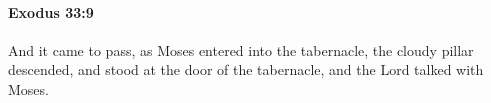
		\paragraph{Exodus 33:9} %
			\label{EXODUS-33-9}

			And it came to pass, as Moses entered into the tabernacle, the cloudy pillar descended, and stood at the door of the tabernacle, and the Lord talked with Moses.


